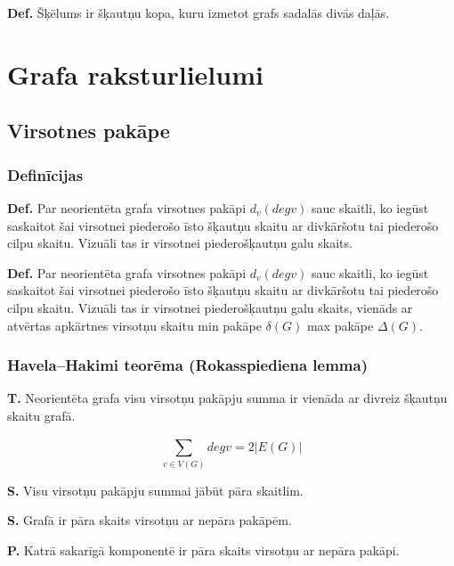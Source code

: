 \documentclass{article}
\begin{document}
\textbf{Def.} Šķēlums ir šķautņu kopa, kuru izmetot grafs sadalās divās daļās.

\section{Grafa raksturlielumi}

\subsection{Virsotnes pakāpe}

\subsubsection{Definīcijas}

\textbf{Def.}  Par neorientēta grafa virsotnes pakāpi $d_v (degv)$ sauc skaitli, ko iegūst saskaitot šai virsotnei piederošo īsto šķautņu skaitu ar divkāršotu tai piederošo cilpu skaitu. Vizuāli tas ir virsotnei piederošķautņu galu skaits.

\textbf{Def.}  Par neorientēta grafa virsotnes pakāpi $d_v (degv )$ sauc skaitli, ko iegūst saskaitot šai virsotnei piederošo īsto šķautņu skaitu ar divkāršotu tai piederošo cilpu skaitu.  Vizuāli tas ir virsotnei piederošķautņu galu skaits, vienāds ar atvērtas apkārtnes virsotņu skaitu min pakāpe $\delta(G )$ max pakāpe $\Delta(G )$.

\subsubsection{Havela–Hakimi teorēma (Rokasspiediena lemma)}

\textbf{T.} Neorientēta grafa visu virsotņu pakāpju summa ir vienāda ar divreiz šķautņu skaitu grafā.

\begin{equation}
	\sum_{ v \in V (G)}^{} degv = 2 | E(G) | 
\end{equation}

\textbf{S.} Visu virsotņu pakāpju summai jābūt pāra skaitlim. 

\textbf{S. } Grafā ir pāra skaits virsotņu ar nepāra pakāpēm. 

\textbf{P. } Katrā sakarīgā komponentē ir pāra skaits virsotņu ar nepāra pakāpi.
\end{document}

